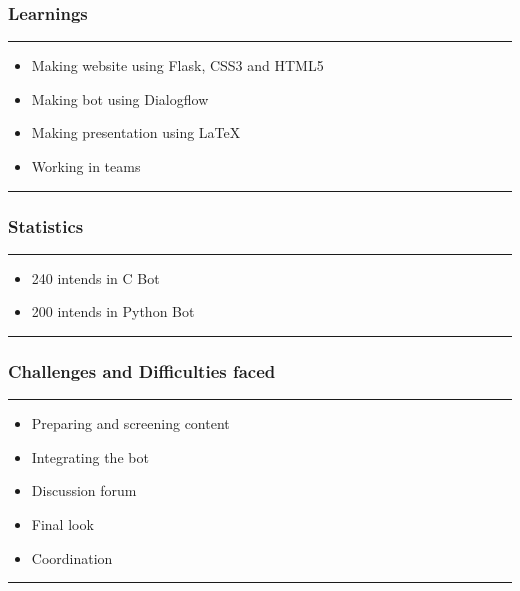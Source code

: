 \documentclass[14pt]{beamer}
\begin{document}
\begin{frame}
    \frametitle{Learnings}
    \noindent
    {\color{pink} \rule{\linewidth}{0.7mm} }
    \begin{itemize}
        \pause
    \item Making website using Flask, CSS3 and HTML5 \\
        \pause
    \item Making bot using Dialogflow \\
        \pause
    \item Making presentation using LaTeX \\
        \pause
    \item Working in teams\\
\end{itemize}
\noindent
    {\color{pink} \rule{\linewidth}{0.7mm} }
\end{frame}


\begin{frame}
    \frametitle{Statistics}
    \noindent
    {\color{pink} \rule{\linewidth}{0.7mm} }
	\begin{itemize} 
	   \pause		
         \item 240 intends in C Bot \\
            \pause
         \item 200 intends in Python Bot \\
	    \pause		
    \end{itemize}
    \noindent
    {\color{pink} \rule{\linewidth}{0.7mm} }
\end{frame}


\begin{frame}
    \frametitle{Challenges and Difficulties faced}
    \noindent
    {\color{pink} \rule{\linewidth}{0.7mm} }
    \begin{itemize}
        \pause
    \item Preparing and screening content \\
        \pause
    \item Integrating the bot \\
        \pause
    \item Discussion forum \\ 
        \pause
    \item Final look \\
        \pause
    \item Coordination \\
\end{itemize}
\noindent
    {\color{pink} \rule{\linewidth}{0.7mm} }
\end{frame}
\end{document}

